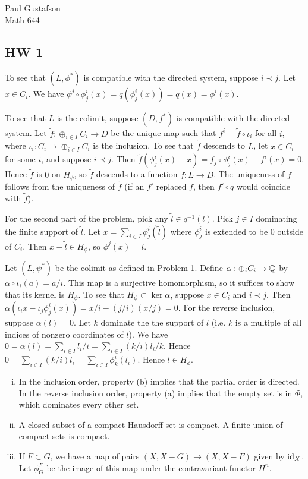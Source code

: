\documentclass{article}
\begin{document}
\noindent Paul Gustafson\\
\noindent Math 644

\subsection*{HW 1}
 To see that $(L, \phi^*)$ is compatible with the directed system, suppose $i \prec j$. Let $x \in C_i$. We have $\phi^j \circ \phi^i_j(x) = q(\phi^i_j(x)) = q(x) = \phi^i(x)$.

To see that $L$ is the colimit, suppose $(D, f^*)$ is compatible with the directed system. Let $\tilde f: \oplus_{i \in I} C_i \to D$ be the unique map such that $f^i = \tilde f \circ \iota_i$ for all $i$, where $\iota_i: C_i \to \oplus_{i \in I} C_i$ is the inclusion.   To see that $\tilde f$ descends to $L$, let $x \in C_i$ for some $i$, and suppose $i \prec j$.  Then $\tilde f(\phi^i_j(x) - x) = f_j \circ \phi^i_j (x) - f^i(x) = 0$.  Hence $\tilde f$ is $0$ on $H_\phi$, so $\tilde f$ descends to a function $f: L \to D$. The uniqueness of $f$ follows from the uniqueness of $\tilde f$ (if an $f'$ replaced $f$, then $f' \circ q$ would coincide with $\tilde f$).

For the second part of the problem, pick any $\tilde l \in q^{-1}(l)$.  Pick $j \in I$ dominating the finite support of $\tilde l$. Let $x = \sum_{i \in I} \phi^i_j(\tilde l)$ where $\phi^i_j$ is extended to be 0 outside of $C_i$. Then $x - \tilde l \in H_\phi$, so $\phi^j(x) = l$.

 Let $(L, \psi^*)$ be the colimit as defined in Problem 1.  Define $\alpha: \oplus_i C_i \to \mathbb{Q}$ by $\alpha \circ \iota_i(a) = a/i$. This map is a surjective homomorphism, so it suffices to show that its kernel is $H_\phi$. To see that $H_\phi \subset \ker \alpha$, suppose $x \in C_i$ and $i \prec j$.   Then $\alpha(\iota_i x - \iota_j \phi^i_j(x)) = x/i - (j/i)  (x/j) = 0$.  For the reverse inclusion, suppose $\alpha(l) = 0$.  Let $k$ dominate the the support of $l$ (i.e. $k$ is a multiple of all indices of nonzero coordinates of $l$).  We have $0 = \alpha(l) = \sum_{i \in I}  l_i/i= \sum_{i \in I}  (k/i) l_i /k$. Hence $0 = \sum_{i \in I} (k/i) l_i = \sum_{i \in I} \phi^i_k(l_i)$.  Hence $l \in H_\phi$.

 \begin{enumerate}[i.]
\item In the inclusion order, property (b) implies that the partial order is directed.  In the reverse inclusion order, property (a) implies that the empty set is in $\Phi$, which dominates every other set.

\item A closed subset of a compact Hausdorff set is compact. A finite union of compact sets is compact.

\item If $F \subset G$, we have a map of pairs $(X, X - G) \to (X, X - F)$ given by $\operatorname{id}_X$. Let $\phi^F_G$ be the image of this map under the contravariant functor $H^n$.  
\end{enumerate}
\end{document}
